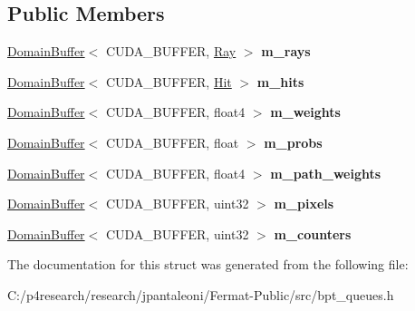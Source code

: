 \subsection*{Public Members}
\begin{DoxyCompactItemize}
\item 
\mbox{\label{struct_b_p_t_queues_storage_a363bfd42942675bc07098fc4414fbed1}} 
\hyperlink{class_domain_buffer}{Domain\+Buffer}$<$ C\+U\+D\+A\+\_\+\+B\+U\+F\+F\+ER, \hyperlink{struct_ray}{Ray} $>$ {\bfseries m\+\_\+rays}
\item 
\mbox{\label{struct_b_p_t_queues_storage_aee3844eaf2918bbce482f69656e158d9}} 
\hyperlink{class_domain_buffer}{Domain\+Buffer}$<$ C\+U\+D\+A\+\_\+\+B\+U\+F\+F\+ER, \hyperlink{struct_hit}{Hit} $>$ {\bfseries m\+\_\+hits}
\item 
\mbox{\label{struct_b_p_t_queues_storage_af66e8fc5d6e771c9377dcbd0328298d9}} 
\hyperlink{class_domain_buffer}{Domain\+Buffer}$<$ C\+U\+D\+A\+\_\+\+B\+U\+F\+F\+ER, float4 $>$ {\bfseries m\+\_\+weights}
\item 
\mbox{\label{struct_b_p_t_queues_storage_ac0b4b456396d7558851913071e957dc2}} 
\hyperlink{class_domain_buffer}{Domain\+Buffer}$<$ C\+U\+D\+A\+\_\+\+B\+U\+F\+F\+ER, float $>$ {\bfseries m\+\_\+probs}
\item 
\mbox{\label{struct_b_p_t_queues_storage_a5860fbb459eeaa1b0fcec78f2107e354}} 
\hyperlink{class_domain_buffer}{Domain\+Buffer}$<$ C\+U\+D\+A\+\_\+\+B\+U\+F\+F\+ER, float4 $>$ {\bfseries m\+\_\+path\+\_\+weights}
\item 
\mbox{\label{struct_b_p_t_queues_storage_a7e01b207f19ccf145aecf10228dc1da1}} 
\hyperlink{class_domain_buffer}{Domain\+Buffer}$<$ C\+U\+D\+A\+\_\+\+B\+U\+F\+F\+ER, uint32 $>$ {\bfseries m\+\_\+pixels}
\item 
\mbox{\label{struct_b_p_t_queues_storage_a3ba36359fe1503957a5118790ae27649}} 
\hyperlink{class_domain_buffer}{Domain\+Buffer}$<$ C\+U\+D\+A\+\_\+\+B\+U\+F\+F\+ER, uint32 $>$ {\bfseries m\+\_\+counters}
\end{DoxyCompactItemize}


The documentation for this struct was generated from the following file\+:\begin{DoxyCompactItemize}
\item 
C\+:/p4research/research/jpantaleoni/\+Fermat-\/\+Public/src/bpt\+\_\+queues.\+h\end{DoxyCompactItemize}

